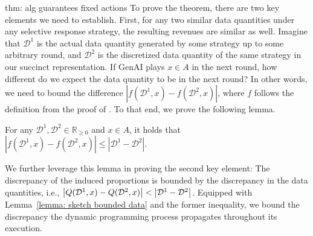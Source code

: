 \begin{sketch}{thm: alg guarantees fixed actions}
To prove the theorem, there are two key elements we need to establish. First, for any two similar data quantities under any selective response strategy, the resulting revenues are similar as well. Imagine that $\mathcal D^1$ is the actual data quantity generated by some strategy up to some arbitrary round, and $\mathcal D^2$ is the discretized data quantity of the same strategy in our succinct representation. If GenAI plays $x\in A$ in the next round, how different do we expect the data quantity to be in the next round? In other words, we need to bound the difference $\left| f(\mathcal{D}^1, x) - f(\mathcal{D}^2, x) \right|$, where $f$ follows the definition from the proof of . To that end, we prove the following lemma. 
\begin{lemma} \label{lemma: sketch bounded data}
For any $\mathcal{D}^1, \mathcal{D}^2 \in \mathbb{R}_{\geq 0}$ and $x\in A$, it holds that $\left| f(\mathcal{D}^1, x) - f(\mathcal{D}^2, x) \right| \leq \left| \mathcal{D}^1 - \mathcal{D}^2 \right|$.
\end{lemma}
We further leverage this lemma in proving the second key element: The discrepancy of the induced proportions is bounded by the discrepancy in the data quantities, i.e., $\left|Q(\mathcal{D}^1, x) - Q(\mathcal{D}^2, x)\right| < \left|\mathcal{D}^1 - \mathcal{D}^2 \right|$. 
Equipped with Lemma~\ref{lemma: sketch bounded data} and the former inequality, we bound the discrepancy the dynamic programming process propagates throughout its execution.
\end{sketch}
